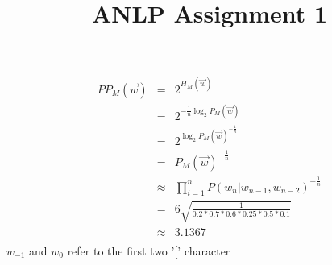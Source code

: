 \documentclass[]{report}
\title{ANLP Assignment 1}
\author{}
\begin{document}
\maketitle

\begin{abstract}
\end{abstract}

 \begin{eqnarray}
 PP_M(\vec{w}) &=& 2^{H_M(\vec{w})} \nonumber \\
		 &=& 2^{-\frac{1}{n} \log_2 P_M(\vec{w}) } \nonumber \\
		 &=& 2^{\log_2 P_M(\vec{w})^{-\frac{1}{n}}} \nonumber \\
		 &=& P_M(\vec{w})^{-\frac{1}{n}} \nonumber \\
		 &\approx& {\prod_{i=1}^{n} P(w_n|w_{n-1},w_{n-2})}^{-\frac{1}{n}} \nonumber \\
		 &=& 6\sqrt{\frac{1}{0.2*0.7*0.6*0.25*0.5*0.1}} \nonumber \\
		 &\approx& 3.1367 \nonumber \\
 \end{eqnarray}
 $w_{-1}$ and $w_0$ refer to the first two {'['} character
 
\end{document}
